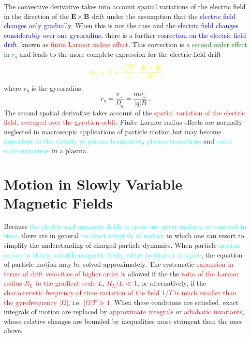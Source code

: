 \documentclass[12pt,a4paper]{article}
\renewcommand{\vec}[1]{\boldsymbol{#1}}
\begin{document}
The convective derivative takes into account spatial variations of the electric field in the direction of the $\vec{E} \times \vec{B}$ drift under the assumption that the \textcolor{blue}{electric field changes only gradually}. When this is not the case and the \textcolor{blue}{electric field changes considerably over one gyroradius}, there is a further \textcolor{blue}{correction on the electric field drift}, known as \textcolor{red}{finite Larmor radius effect}. This correction is a \textcolor{green}{second order effect in $r_g$} and leads to the more complete expression for the electric field drift
\begin{equation}
\color{yellow} \vec{v}_E = (1 +\frac{r_g^2 \nabla^2}{4} ) \frac{\vec{E} \times \vec{B} }{B^2} 
\end{equation}
where $r_g$ is the gyroradius,
\begin{equation}
r_g = \dfrac{v_\perp}{\Omega_g} = \dfrac{mv_\perp}{|q| B} ~.
\end{equation}
The second spatial derivative takes account of the \textcolor{red}{spatial variation of the electric field, averaged over the gyration orbit}. Finite Larmor radius effects are normally neglected in macroscopic applications of particle motion but may become \textcolor{cyan}{important in the vicinity of plasma boundaries}, \textcolor{cyan}{plasma transitions} and \textcolor{cyan}{small scale structures} in a plasma.


\section{Motion in Slowly Variable Magnetic Fields}
\cite{2015bps..book.....C} Because \textcolor{cyan}{the electric and magnetic fields in space are never uniform or constant in time}, there are in general \textcolor{cyan}{no exact integrals of motion} to which one can resort to simplify the understanding of charged particle dynamics. When particle \textcolor{cyan}{motion occurs in slowly variable magnetic fields, either in time or in space}, the equation of particle motion may be solved approximately. The systematic \textcolor{red}{expansion in terms of drift velocities of higher order} is allowed if the the \textcolor{red}{ratio of the Larmor radius $R_L$ to the gradient scale $L$}, \textcolor{red}{$R_L/L \ll 1$}, or alternatively, if the \textcolor{red}{characteristic frequency of time variation of the field $1/T$ is much smaller than the gyrofrequency $|\Omega|$}, i.e. \textcolor{red}{$|\Omega|T \gg1$}. When these conditions are satisfied, exact integrals of motion are replaced by \textcolor{red}{approximate integrals} or \textcolor{red}{adiabatic invariants}, whose relative changes are bounded by inequalities more stringent than the ones above.
\end{document}
